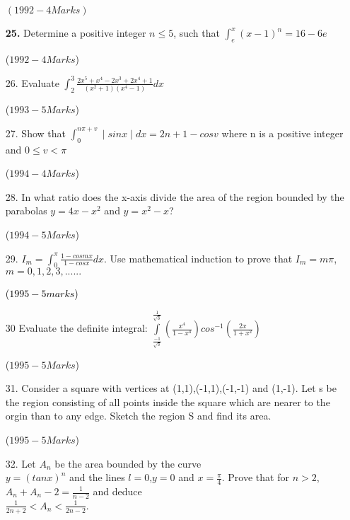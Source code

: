 \documentclass[journal,12pt,twocolumn]{IEEEtran}
\theoremstyle{remark}
\begin{document}
\begin{enumerate}
\hfill{$(1992-4 Marks)$}

\textbf{25.} Determine a positive integer $n\leq 5$, such that $\int_e^x(x-1)^n=16-6e$

\hfill{{($1992-4 Marks$)}}\\

\item[26.]  Evaluate $\int_{2}^{3}\frac{2x^5+x^4-2x^3+2x^4+1}{(x^2+1)(x^4-1)}dx$

\hfill{($1993 - 5 Marks$)}

\item[27.]  Show that $\int_{0}^{n\pi+v}\mid sinx \mid dx=2n+1-cosv$ where n is a positive integer and $0 \leq v < \pi$

\hfill{($1994-4 Marks$)}\\

\item[28.]  In what ratio does the x-axis divide the area of the region bounded by the parabolas $y=4x-x^2$ and $y=x^2-x$?

\hfill{($1994-5 Marks$)}\\

\item[29.]  $I_m=\int_{0}^{\pi}\frac{1-cosmx}{1-cosx}dx$. Use mathematical induction to prove that $I_m=m\pi$, $m=0,1,2,3,......$

\hfill{\textcolor{black}{($1995-5 marks$)}}\\

\item[30]  Evaluate the definite integral:
$\int\limits_{\frac{-1}{\sqrt{3}}}^{\frac{1}{\sqrt{3}}}(\frac{x^4}{1-x^4})cos^{-1}(\frac{2x}{1+x^2})$

\hfill{($1995-5Marks$)}\\

\item[31.]  Consider a square with vertices at (1,1),(-1,1),(-1,-1) and (1,-1). Let s be the region consisting of all points inside  the square which are nearer to the orgin than to any edge. Sketch the region S and find its area.

\hfill{($1995-5 Marks$)}\\

\item[32.]  Let $A_n$ be the area bounded by the curve\\ $y=(tanx)^n$ and the lines $l=0$,$y=0$ and $x=\frac{\pi}{4}$. Prove that for $n>2$, $A_n+A_n-2=\frac{1}{n-2}$ and deduce\\ $\frac{1}{2n+2}<A_n<\frac{1}{2n-2}$.


\end{enumerate}
\end{document}
